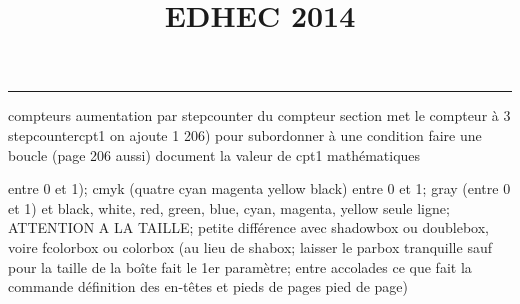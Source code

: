 \documentclass[11pt]{article}%
\title{\bf \vspace{-2cm} EDHEC 2014} %
\author{} %
\date{} %
\renewcommand{\headrulewidth}{0pt}%
\renewcommand{\footrulewidth}{0.4pt}%
\begin{document}
\maketitle %
\vspace{-1.4cm}\hrule %
\thispagestyle{fancy}

\vspace*{.2cm}



compteurs%
aumentation par stepcounter du compteur section%
met le compteur à 3%
stepcounter{cpt1} on ajoute 1%
206) pour subordonner à une condition %
faire une boucle (page 206 aussi) %
document la valeur de cpt1 
mathématiques\newcommand{\ch}{\operatorname{ch}} 
\newcommand{\sh}{\operatorname{sh}}
\renewcommand{\tanh}{\operatorname{th}}
\renewcommand{\sinh}{\operatorname{sh}}
\renewcommand{\cosh}{\operatorname{ch}}
\newcommand{\argsh}{\operatorname{argsh}}
\newcommand{\argch}{\operatorname{argch}}
\newcommand{\argth}{\operatorname{argth}}
\newcommand{\Id}{\operatorname{Id}}
\newcommand{\id}{\operatorname{id}}
\renewcommand{\im}{\operatorname{Im}}
\renewcommand{\leq}{\leq}
\renewcommand{\geq}{\geq }

\newcommand{\dlim}{\lim}
\newcommand{\dsum}{\sum\limits}
\newcommand{\dprod}{\prod}
\newcommand{\lb}{\llbracket}
\newcommand{\rb}{\rrbracket}


entre 0 et 1); cmyk (quatre cyan magenta yellow black) entre 0 et 1;
gray (entre 0 et 1) et black, white, red, green, blue, cyan, magenta,
yellow%
seule ligne; ATTENTION A LA TAILLE; petite différence avec shadowbox ou
doublebox, voire fcolorbox ou colorbox (au lieu de shabox; laisser le
parbox tranquille sauf pour la taille de la boîte
\newcommand{\Tbox}[1]{\begin{center} \shabox{\parbox{0.8
\linewidth}{#1}} \end{center}} %
fait le 1er paramètre; entre accolades ce que fait la commande
définition des en-têtes et pieds de pages\pagestyle{fancy}
\chead{}
\rfoot[ \ \thepage]{\thepage}
\cfoot{}
\lfoot{}
\thispagestyle{fancy} %
pied de page)\renewcommand{\footrulewidth}{0.4pt}
\renewcommand{\headrulewidth}{0.4pt}
\end{document}

